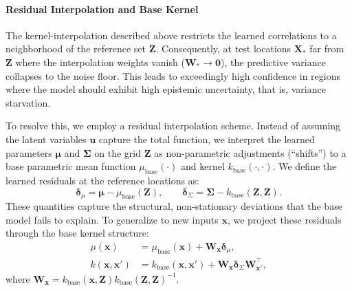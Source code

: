 \documentclass{article}
\begin{document}
\paragraph{Residual Interpolation and Base Kernel}
The kernel-interpolation described above restricts the learned correlations to a neighborhood of the reference set $\mathbf{Z}$. Consequently, at test locations $\mathbf{X}_*$ far from $\mathbf{Z}$ where the interpolation weights vanish ($\mathbf{W}_* \to \mathbf{0}$), the predictive variance collapses to the noise floor. This leads to exceedingly high confidence in regions where the model should exhibit high epistemic uncertainty, that is, variance starvation.

To resolve this, we employ a residual interpolation scheme.
 Instead of assuming the latent variables $\mathbf{u}$ capture the total function, we interpret the learned parameters $\boldsymbol{\mu}$ and $\boldsymbol{\Sigma}$ on the grid $\mathbf{Z}$ as non-parametric adjustments (``shifts'') to a base parametric mean function $\mu_{\text{base}}(\cdot)$ and kernel $k_{\text{base}}(\cdot, \cdot)$. We define the learned residuals at the reference locations as:
\begin{equation}
\nonumber
    \boldsymbol{\delta}_{\mu} = \boldsymbol{\mu} - \mu_{\text{base}}(\mathbf{Z}), \qquad
    \boldsymbol{\delta}_{\Sigma} = \boldsymbol{\Sigma} - k_{\text{base}}(\mathbf{Z}, \mathbf{Z}).
\end{equation}
These quantities capture the structural, non-stationary deviations that the base model fails to explain.
To generalize to new inputs $\mathbf{x}$, we project these residuals through the base kernel structure:
\begin{equation}
\label{eq:residual_interpolant}
\begin{aligned}
    \mu(\mathbf{x}) &= \mu_{\text{base}}(\mathbf{x}) + \mathbf{W}_{\mathbf{x}} \boldsymbol{\delta}_{\mu}, \\
    k(\mathbf{x}, \mathbf{x}') &= k_{\text{base}}(\mathbf{x}, \mathbf{x}') + \mathbf{W}_{\mathbf{x}} \boldsymbol{\delta}_{\Sigma} \mathbf{W}_{\mathbf{x}'}^\top,
\end{aligned}
\end{equation}
where $\mathbf{W}_{\mathbf{x}} = k_{\text{base}}(\mathbf{x}, \mathbf{Z}) k_{\text{base}}(\mathbf{Z}, \mathbf{Z})^{-1}$.
\end{document}
